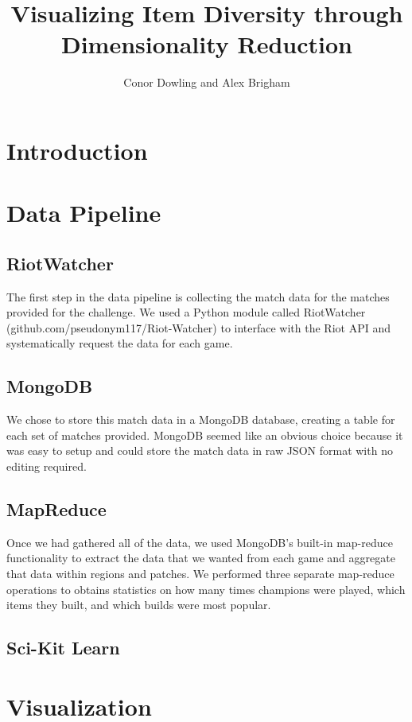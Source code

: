 \documentclass[11pt]{amsart}
\title{Visualizing Item Diversity through Dimensionality Reduction}
\author{Conor Dowling and Alex Brigham}
\begin{document}
\maketitle


\section{Introduction}

\section{Data Pipeline}
\subsection{RiotWatcher}
The first step in the data pipeline is collecting the match data for the matches provided for the challenge. We used a Python module called RiotWatcher (github.com/pseudonym117/Riot-Watcher) to interface with the Riot API and systematically request the data for each game.

\subsection{MongoDB}
We chose to store this match data in a MongoDB database, creating a table for each set of matches provided. MongoDB seemed like an obvious choice because it was easy to setup and could store the match data in raw JSON format with no editing required.

\subsection{MapReduce}
Once we had gathered all of the data, we used MongoDB's built-in map-reduce functionality to extract the data that we wanted from each game and aggregate that data within regions and patches. We performed three separate map-reduce operations to obtains statistics on how many times champions were played, which items they built, and which builds were most popular.

\subsection{Sci-Kit Learn}



\section{Visualization}
\end{document}
